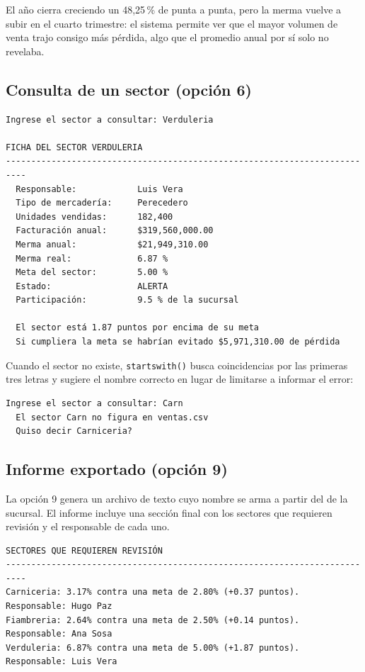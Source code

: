 \documentclass[12pt]{article}
\newcommand{\codigo}[1]{\texttt{\small #1}}
\begin{document}
El año cierra creciendo un 48,25\,\% de punta a punta, pero la merma vuelve a subir en el cuarto trimestre: el sistema permite ver que el mayor volumen de venta trajo consigo más pérdida, algo que el promedio anual por sí solo no revelaba.

\newpage

\subsection{Consulta de un sector (opción 6)}

\begin{lstlisting}[style=salida]
Ingrese el sector a consultar: Verduleria

FICHA DEL SECTOR VERDULERIA
--------------------------------------------------------------------------
  Responsable:            Luis Vera
  Tipo de mercadería:     Perecedero
  Unidades vendidas:      182,400
  Facturación anual:      $319,560,000.00
  Merma anual:            $21,949,310.00
  Merma real:             6.87 %
  Meta del sector:        5.00 %
  Estado:                 ALERTA
  Participación:          9.5 % de la sucursal

  El sector está 1.87 puntos por encima de su meta
  Si cumpliera la meta se habrían evitado $5,971,310.00 de pérdida
\end{lstlisting}

Cuando el sector no existe, \codigo{startswith()} busca coincidencias por las primeras tres letras y sugiere el nombre correcto en lugar de limitarse a informar el error:

\begin{lstlisting}[style=salida]
Ingrese el sector a consultar: Carn
  El sector Carn no figura en ventas.csv
  Quiso decir Carniceria?
\end{lstlisting}

\subsection{Informe exportado (opción 9)}

La opción 9 genera un archivo de texto cuyo nombre se arma a partir del de la sucursal. El informe incluye una sección final con los sectores que requieren revisión y el responsable de cada uno.

\begin{lstlisting}[style=salida]
SECTORES QUE REQUIEREN REVISIÓN
--------------------------------------------------------------------------
Carniceria: 3.17% contra una meta de 2.80% (+0.37 puntos). Responsable: Hugo Paz
Fiambreria: 2.64% contra una meta de 2.50% (+0.14 puntos). Responsable: Ana Sosa
Verduleria: 6.87% contra una meta de 5.00% (+1.87 puntos). Responsable: Luis Vera
\end{lstlisting}
\end{document}

